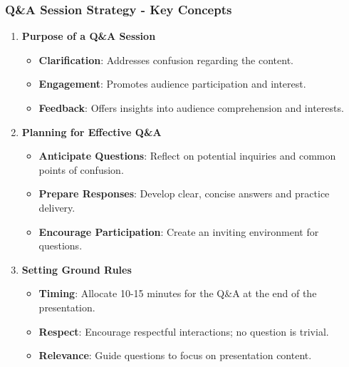 \documentclass[aspectratio=169]{beamer}
\begin{document}
\begin{frame}[fragile]
    \frametitle{Q\&A Session Strategy - Key Concepts}
    \begin{enumerate}
        \item \textbf{Purpose of a Q\&A Session}
            \begin{itemize}
                \item \textbf{Clarification}: Addresses confusion regarding the content.
                \item \textbf{Engagement}: Promotes audience participation and interest.
                \item \textbf{Feedback}: Offers insights into audience comprehension and interests.
            \end{itemize}
        
        \item \textbf{Planning for Effective Q\&A}
            \begin{itemize}
                \item \textbf{Anticipate Questions}: Reflect on potential inquiries and common points of confusion.
                \item \textbf{Prepare Responses}: Develop clear, concise answers and practice delivery.
                \item \textbf{Encourage Participation}: Create an inviting environment for questions.
            \end{itemize}
        
        \item \textbf{Setting Ground Rules}
            \begin{itemize}
                \item \textbf{Timing}: Allocate 10-15 minutes for the Q\&A at the end of the presentation.
                \item \textbf{Respect}: Encourage respectful interactions; no question is trivial.
                \item \textbf{Relevance}: Guide questions to focus on presentation content.
            \end{itemize}
    \end{enumerate}
\end{frame}
\end{document}
